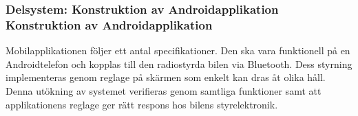 \documentclass[a4paper]{article}
\begin{document}




\subsubsection{Delsystem: Konstruktion av Androidapplikation \\ Konstruktion av Androidapplikation}
Mobilapplikationen följer ett antal specifikationer. Den ska vara funktionell på en Androidtelefon och kopplas till den radiostyrda bilen via Bluetooth. Dess styrning implementeras genom reglage på skärmen som enkelt kan dras åt olika håll. Denna utökning av systemet verifieras genom samtliga funktioner samt att applikationens reglage ger rätt respons hos bilens styrelektronik. 
\end{document}
